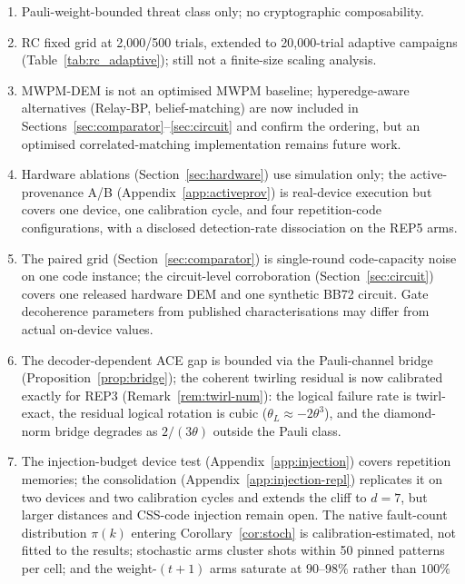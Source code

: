 \documentclass[11pt,a4paper]{article}
\begin{document}
\begin{enumerate}[leftmargin=1.4em]
  \item Pauli-weight-bounded threat class only; no cryptographic composability.
  \item RC fixed grid at 2{,}000/500 trials, extended to
    20{,}000-trial adaptive campaigns
    (Table~\ref{tab:rc_adaptive}); still not a finite-size scaling
    analysis.
  \item MWPM-DEM is not an optimised MWPM baseline; hyperedge-aware
    alternatives (Relay-BP, belief-matching) are now included in
    Sections~\ref{sec:comparator}--\ref{sec:circuit} and confirm the
    ordering, but an optimised correlated-matching implementation remains
    future work.
  \item Hardware ablations (Section~\ref{sec:hardware}) use simulation only;
    the active-provenance A/B (Appendix~\ref{app:activeprov}) is real-device
    execution but covers one device, one calibration cycle, and four
    repetition-code configurations, with a disclosed detection-rate
    dissociation on the REP5 arms.
  \item The paired grid (Section~\ref{sec:comparator}) is single-round
    code-capacity noise on one code instance; the circuit-level
    corroboration (Section~\ref{sec:circuit}) covers one released hardware
    DEM and one synthetic BB72 circuit. Gate decoherence parameters from
    published characterisations may differ from actual on-device values.
  \item The decoder-dependent ACE gap is bounded via the Pauli-channel
    bridge (Proposition~\ref{prop:bridge}); the coherent twirling
    residual is now calibrated exactly for REP3
    (Remark~\ref{rem:twirl-num}): the logical failure rate is
    twirl-exact, the residual logical rotation is cubic
    ($\theta_L\approx-2\theta^3$), and the diamond-norm bridge degrades
    as $2/(3\theta)$ outside the Pauli class.
  \item The injection-budget device test (Appendix~\ref{app:injection})
    covers repetition memories; the consolidation
    (Appendix~\ref{app:injection-repl}) replicates it on two devices and
    two calibration cycles and extends the cliff to $d{=}7$, but larger
    distances and CSS-code injection remain open. The native fault-count
    distribution $\pi(k)$ entering Corollary~\ref{cor:stoch} is
    calibration-estimated, not fitted to the results; stochastic arms
    cluster shots within 50 pinned patterns per cell; and the
    weight-$(t{+}1)$ arms saturate at $90$--$98\%$ rather than $100\%$

\end{enumerate}
\end{document}
